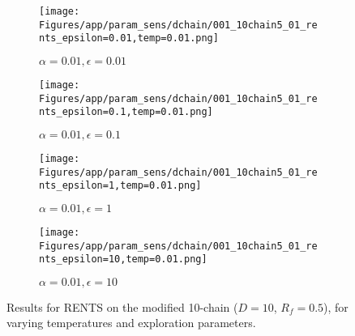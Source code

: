 \documentclass{article}
\theoremstyle{plain}
\begin{document}
\begin{appendices}
\begin{figure}
                \begin{subfigure}[b]{0.24\textwidth}
                    \centering
                    \texttt{[image: Figures/app/param\_sens/dchain/001\_10chain5\_01\_rents\_epsilon=0.01,temp=0.01.png]}
                    \caption*{$\alpha=0.01,\epsilon=0.01$}
                \end{subfigure}
                \begin{subfigure}[b]{0.24\textwidth}
                    \centering
                    \texttt{[image: Figures/app/param\_sens/dchain/001\_10chain5\_01\_rents\_epsilon=0.1,temp=0.01.png]}
                    \caption*{$\alpha=0.01,\epsilon=0.1$}
                \end{subfigure}
                \begin{subfigure}[b]{0.24\textwidth}
                    \centering
                    \texttt{[image: Figures/app/param\_sens/dchain/001\_10chain5\_01\_rents\_epsilon=1,temp=0.01.png]}
                    \caption*{$\alpha=0.01,\epsilon=1$}
                \end{subfigure}
                \begin{subfigure}[b]{0.24\textwidth}
                    \centering
                    \texttt{[image: Figures/app/param\_sens/dchain/001\_10chain5\_01\_rents\_epsilon=10,temp=0.01.png]}
                    \caption*{$\alpha=0.01,\epsilon=10$}
                \end{subfigure}
                
                \caption{Results for RENTS on the modified 10-chain ($D=10$, $R_f=0.5$), for varying temperatures and exploration parameters.}
                \label{fig:rents_10chain_half_hps}
            \end{figure}


            \begin{figure}
                \centering
                

\end{figure}
\end{appendices}
\end{document}
